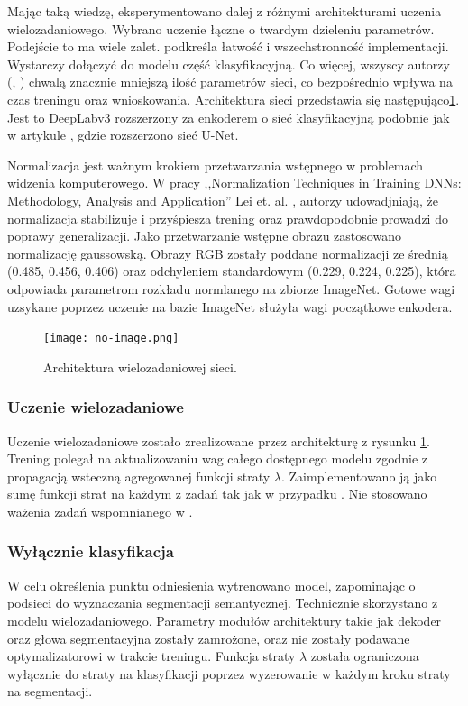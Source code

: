 Mając taką wiedzę, eksperymentowano dalej z różnymi architekturami uczenia wielozadaniowego. Wybrano uczenie łączne o twardym dzieleniu parametrów. Podejście to ma wiele zalet. \cite{mehta2018net} podkreśla łatwość i wszechstronność implementacji. Wystarczy dołączyć do modelu część klasyfikacyjną. Co więcej, wszyscy autorzy (\cite{mehta2018net}, \cite{9892852}) chwalą znacznie mniejszą ilość parametrów sieci, co bezpośrednio wpływa na czas treningu oraz wnioskowania. Architektura sieci przedstawia się następująco\ref{fig:multitask}. Jest to DeepLabv3 rozszerzony za enkoderem o sieć klasyfikacyjną podobnie jak w artykule \cite{mehta2018net}, gdzie rozszerzono sieć U-Net.

Normalizacja jest ważnym krokiem przetwarzania wstępnego w problemach widzenia komputerowego. W pracy ,,Normalization Techniques in Training DNNs: Methodology, Analysis and Application'' Lei et. al. \cite{huang2020normalization}, autorzy udowadjniają, że normalizacja stabilizuje i przyśpiesza trening oraz prawdopodobnie prowadzi do poprawy generalizacji. Jako przetwarzanie wstępne obrazu zastosowano normalizację gaussowską. Obrazy RGB zostały poddane normalizacji ze średnią (0.485, 0.456, 0.406) oraz odchyleniem standardowym (0.229, 0.224, 0.225), która odpowiada parametrom rozkładu normlanego na zbiorze ImageNet. Gotowe wagi uzsykane poprzez uczenie na bazie ImageNet służyła wagi początkowe enkodera.


\begin{figure}[ht!]
\centering
\texttt{[image: no-image.png]}
\caption{Architektura wielozadaniowej sieci.}
\label{fig:multitask}
\end{figure}


\subsubsection{Uczenie wielozadaniowe}
Uczenie wielozadaniowe zostało zrealizowane przez architekturę z rysunku \ref{fig:multitask}. Trening polegał na aktualizowaniu wag całego dostępnego modelu zgodnie z propagacją wsteczną agregowanej funkcji straty $\lambda$. Zaimplementowano ją jako sumę funkcji strat na każdym z zadań tak jak w przypadku \cite{mehta2018net}. Nie stosowano ważenia zadań wspomnianego w \cite{9892852}.

\subsubsection{Wyłącznie klasyfikacja}
W celu określenia punktu odniesienia wytrenowano model, zapominając o podsieci do wyznaczania segmentacji semantycznej. Technicznie skorzystano z modelu wielozadaniowego. Parametry modułów architektury takie jak dekoder oraz głowa segmentacyjna zostały zamrożone, oraz nie zostały podawane optymalizatorowi w trakcie treningu. Funkcja straty $\lambda$ została ograniczona wyłącznie do straty na klasyfikacji poprzez wyzerowanie w każdym kroku straty na segmentacji.

